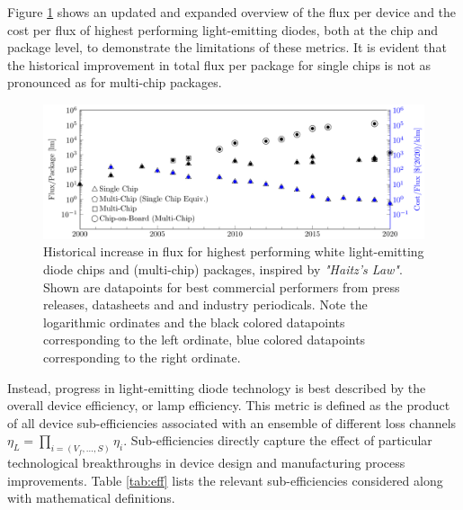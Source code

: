 \documentclass[a4paper,nocompress]{spie}  %
\begin{document}
    Figure \ref{fig:haitz} shows an updated and expanded overview of the flux per device and the cost per flux of highest performing light-emitting diodes, both at the chip and package level, to demonstrate the limitations of these metrics. It is evident that the historical improvement in total flux per package for single chips is not as pronounced as for multi-chip packages.

    \begin{figure} [ht]
        \begin{center}
            \includegraphics[width=\textwidth]{haitz_law_white.pdf}
        \end{center}
        \caption{Historical increase in flux for highest performing white light-emitting diode chips and (multi-chip) packages, inspired by \textit{"Haitz's Law"}\cite{haitz1999case}. Shown are datapoints for best commercial performers from press releases, datasheets and and industry periodicals. Note the logarithmic ordinates and the black colored datapoints corresponding to the left ordinate, blue colored datapoints corresponding to the right ordinate.}
        \label{fig:haitz}
    \end{figure}

    \clearpage
    Instead, progress in light-emitting diode technology is best described by the overall device efficiency, or lamp efficiency. This metric is defined as the product of all device sub-efficiencies associated with an ensemble of different loss channels $\eta_L = \prod_{i=(V_f,\dots,S)} \eta_i$. Sub-efficiencies directly capture the effect of particular technological breakthroughs in device design and manufacturing process improvements. Table \ref{tab:eff} lists the relevant sub-efficiencies considered along with mathematical definitions.
    
\end{document}
